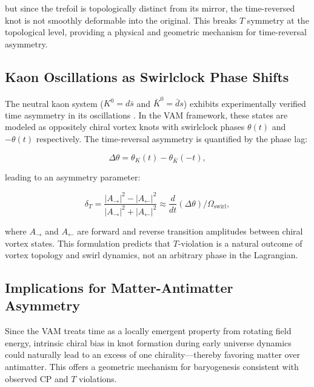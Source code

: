 but since the trefoil is topologically distinct from its mirror, the time-reversed knot is not smoothly deformable into the original. This breaks $T$ symmetry at the topological level, providing a physical and geometric mechanism for time-reversal asymmetry.

\subsection{Kaon Oscillations as Swirlclock Phase Shifts}

The neutral kaon system ($K^0 = d\bar{s}$ and $\bar{K}^0 = \bar{d}s$) exhibits experimentally verified time asymmetry in its oscillations \cite{christenson1964evidence, cplear1998tviolation}. In the VAM framework, these states are modeled as oppositely chiral vortex knots with swirlclock phases $\theta(t)$ and $-\theta(t)$ respectively. The time-reversal asymmetry is quantified by the phase lag:

\begin{equation}
\Delta \theta = \theta_K(t) - \theta_{\bar{K}}(-t),
\end{equation}

leading to an asymmetry parameter:

\begin{equation}
\delta_T = \frac{|A_{\rightarrow}|^2 - |A_{\leftarrow}|^2}{|A_{\rightarrow}|^2 + |A_{\leftarrow}|^2} \approx \frac{d}{dt} (\Delta \theta) \Big/ \Omega_{\text{swirl}},
\end{equation}

where $A_{\rightarrow}$ and $A_{\leftarrow}$ are forward and reverse transition amplitudes between chiral vortex states. This formulation predicts that $T$-violation is a natural outcome of vortex topology and swirl dynamics, not an arbitrary phase in the Lagrangian.

\subsection{Implications for Matter-Antimatter Asymmetry}

Since the VAM treats time as a locally emergent property from rotating field energy, intrinsic chiral bias in knot formation during early universe dynamics could naturally lead to an excess of one chirality—thereby favoring matter over antimatter. This offers a geometric mechanism for baryogenesis consistent with observed CP and $T$ violations.

